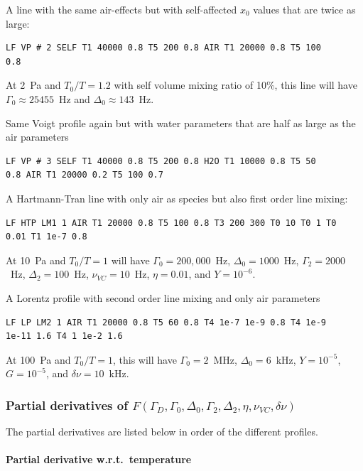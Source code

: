 A line with the same air-effects but with self-affected $x_0$ values that are twice as large:
\begin{verbatim}
LF VP # 2 SELF T1 40000 0.8 T5 200 0.8 AIR T1 20000 0.8 T5 100
0.8 
\end{verbatim}
At 2~Pa and $T_0/T = 1.2$ with self volume mixing ratio of 10\%, this line 
will have $\Gamma_0\approx25455$~Hz and $\Delta_0\approx143$~Hz.

Same Voigt profile again but with water parameters that are half as 
large as the air parameters
\begin{verbatim}
LF VP # 3 SELF T1 40000 0.8 T5 200 0.8 H2O T1 10000 0.8 T5 50
0.8 AIR T1 20000 0.2 T5 100 0.7 
\end{verbatim}


A Hartmann-Tran line with only air as species but also first order line mixing:
\begin{verbatim}
LF HTP LM1 1 AIR T1 20000 0.8 T5 100 0.8 T3 200 300 T0 10 T0 1 T0
0.01 T1 1e-7 0.8
\end{verbatim}
At 10~Pa and $T_0/T = 1$ will have $\Gamma_0=200,000$~Hz, $\Delta_0=1000$~Hz, 
$\Gamma_2=2000$~Hz, $\Delta_2=100$~Hz, $\nu_{VC}=10$~Hz, $\eta=0.01$, and $Y=10^{-6}$.

A Lorentz profile with second order line mixing and only air parameters
\begin{verbatim}
LF LP LM2 1 AIR T1 20000 0.8 T5 60 0.8 T4 1e-7 1e-9 0.8 T4 1e-9 
1e-11 1.6 T4 1 1e-2 1.6
\end{verbatim}
At 100~Pa and $T_0/T = 1$, this will have $\Gamma_0=2$~MHz, $\Delta_0=6$~kHz,
$Y=10^{-5}$, $G=10^{-5}$, and $\delta\nu=10$~kHz.

\subsubsection{Partial derivatives of $F\left( \Gamma_D, \Gamma_0, 
            \Delta_0, \Gamma_2, \Delta_2, \eta, \nu_{VC}, \delta\nu \right)$}

The partial derivatives are listed below in order of the different profiles. 

\paragraph*{Partial derivative w.r.t.\ temperature}

